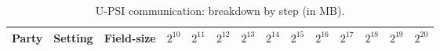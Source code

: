 







\begin{table*}[!htbp]
\begin{footnotesize}
\begin{center}
\caption{ \small U-PSI communication: breakdown by step (in MB).}\label{tbl::PSI} 
\renewcommand{\arraystretch}{1.3}
\begin{tabular}{|c|c|c|c|c|c|c|c|c|c|c|c|c|c|} 
\hline 
\cellcolor{gray!20}\scriptsize \textbf{Party} &\cellcolor{gray!20} \scriptsize \textbf{Setting}&\cellcolor{gray!20} \scriptsize \textbf{Field-size} &\scriptsize\cellcolor{gray!20} $2^{\scriptscriptstyle 10}$\scriptsize &\scriptsize\cellcolor{gray!20}  $2^{\scriptscriptstyle 11}$&\scriptsize  \cellcolor{gray!20}$2^{\scriptscriptstyle 12}$&\scriptsize\cellcolor{gray!20}  $2^{\scriptscriptstyle 13}$&\scriptsize\cellcolor{gray!20} $2^{\scriptscriptstyle 14}$&\scriptsize\cellcolor{gray!20}   $2^{\scriptscriptstyle 15}$&\scriptsize\cellcolor{gray!20}  $2^{\scriptscriptstyle 16}$&\scriptsize\cellcolor{gray!20}   $2^{\scriptscriptstyle 17}$&\scriptsize \cellcolor{gray!20}  $2^{\scriptscriptstyle 18}$&\scriptsize \cellcolor{gray!20} $2^{\scriptscriptstyle 19}$&\scriptsize\cellcolor{gray!20}  $2^{\scriptscriptstyle 20}$ \\
    \hline
    

\end{tabular}
\end{center}
\end{footnotesize}
\end{table*}
